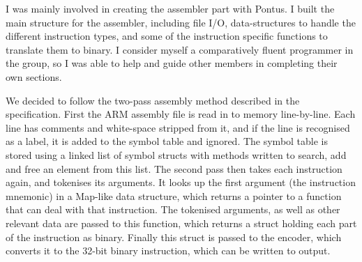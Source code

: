 I was mainly involved in creating the assembler part with Pontus. I built the main structure for the assembler, including file I/O, data-structures to handle the different instruction types, and some of the instruction specific functions to translate them to binary. I consider myself a comparatively fluent programmer in the group, so I was able to help and guide other members in completing their own sections. 

We decided to follow the two-pass assembly method described in the specification. First the ARM assembly file is read in to memory line-by-line. Each line has comments and white-space stripped from it, and if the line is recognised as a label, it is added to the symbol table and ignored. The symbol table is stored using a linked list of symbol structs with methods written to search, add and free an element from this list. The second pass then takes each instruction again, and tokenises its arguments. It looks up the first argument (the instruction mnemonic) in a Map-like data structure, which returns a pointer to a function that can deal with that instruction. The tokenised arguments, as well as other relevant data are passed to this function, which returns a struct holding each part of the instruction as binary. Finally this struct is passed to the encoder, which converts it to the 32-bit binary instruction, which can be written to output.